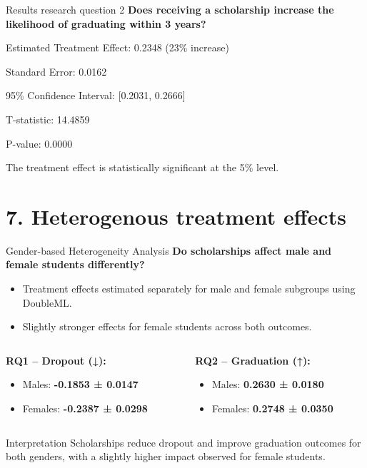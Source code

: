 \documentclass[aspectratio=169]{beamer}
\begin{document}
\begin{frame}{Results research question 2}
\textbf{Does receiving a scholarship increase the likelihood of graduating within 3 years?}

Estimated Treatment Effect: 0.2348 (23\% increase)

Standard Error: 0.0162

95\% Confidence Interval: [0.2031, 0.2666]

T-statistic: 14.4859

P-value: 0.0000

The treatment effect is statistically significant at the 5\% level.

\end{frame}

\section{7. Heterogenous treatment effects}
\begin{frame}{Gender-based Heterogeneity Analysis}
\textbf{Do scholarships affect male and female students differently?}
\vspace{8pt}

\begin{itemize}
    \item Treatment effects estimated separately for male and female subgroups using DoubleML.
    \item Slightly stronger effects for female students across both outcomes.
\end{itemize}

\vspace{10pt}

\begin{columns}
\begin{column}{0.5\textwidth}
\textbf{RQ1 – Dropout (↓):}
\begin{itemize}
    \item Males: \textbf{-0.1853 ± 0.0147}
    \item Females: \textbf{-0.2387 ± 0.0298}
\end{itemize}
\end{column}

\begin{column}{0.5\textwidth}
\textbf{RQ2 – Graduation (↑):}
\begin{itemize}
    \item Males: \textbf{0.2630 ± 0.0180}
    \item Females: \textbf{0.2748 ± 0.0350}
\end{itemize}
\end{column}
\end{columns}

\vspace{5pt}
\begin{block}{Interpretation}
Scholarships reduce dropout and improve graduation outcomes for both genders, with a slightly higher impact observed for female students.
\end{block}

\end{frame}
\end{document}
